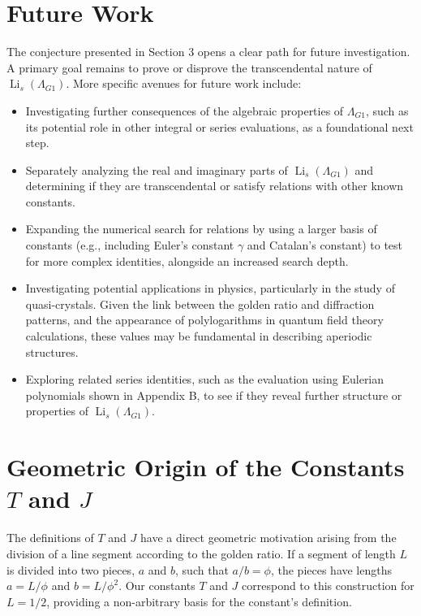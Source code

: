 \documentclass{amsart}
\theoremstyle{plain}
\theoremstyle{definition}
\theoremstyle{remark}
\DeclareMathOperator{\Li}{Li}
\newcommand{\LambdaG}{\Lambda_{G1}}
\newcommand{\phiG}{\phi}
\begin{document}
\section{Future Work}
The conjecture presented in Section 3 opens a clear path for future investigation. A primary goal remains to prove or disprove the transcendental nature of $\Li_s(\LambdaG)$. More specific avenues for future work include:
\begin{itemize}
    \item Investigating further consequences of the algebraic properties of $\LambdaG$, such as its potential role in other integral or series evaluations, as a foundational next step.
    \item Separately analyzing the real and imaginary parts of $\Li_s(\LambdaG)$ and determining if they are transcendental or satisfy relations with other known constants.
    \item Expanding the numerical search for relations by using a larger basis of constants (e.g., including Euler's constant $\gamma$ and Catalan's constant) to test for more complex identities, alongside an increased search depth.
    \item Investigating potential applications in physics, particularly in the study of quasi-crystals. Given the link between the golden ratio and diffraction patterns, and the appearance of polylogarithms in quantum field theory calculations, these values may be fundamental in describing aperiodic structures.
    \item Exploring related series identities, such as the evaluation using Eulerian polynomials shown in Appendix B, to see if they reveal further structure or properties of $\Li_s(\LambdaG)$.
\end{itemize}

\appendix
\section{Geometric Origin of the Constants \texorpdfstring{$T$ and $J$}{T and J}}
The definitions of $T$ and $J$ have a direct geometric motivation arising from the division of a line segment according to the golden ratio. If a segment of length $L$ is divided into two pieces, $a$ and $b$, such that $a/b = \phiG$, the pieces have lengths $a=L/\phiG$ and $b=L/\phiG^2$. Our constants $T$ and $J$ correspond to this construction for $L=1/2$, providing a non-arbitrary basis for the constant's definition.
\end{document}
